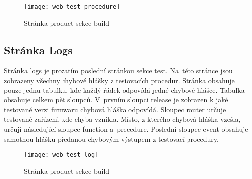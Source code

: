 \begin{figure}[h]
  \centering
  \texttt{[image: web\_test\_procedure]}
  \caption{Stránka product sekce build}
  \label{fig:web_test_device}
\end{figure}

\subsection{Stránka Logs}
Stránka logs je prozatím poslední stránkou sekce test. Na~této stránce jsou zobrazeny všechny chybové hlášky z testovacích procedur. Stránka obsahuje pouze jednu tabulku, kde každý řádek odpovídá jedné chybové hlášce. Tabulka obsahuje celkem pět sloupců. V~prvním sloupci release je zobrazen k jaké testované verzi firmwaru chybová hláška odpovídá. Sloupec router určuje testované zařízení, kde chyba vznikla. Místo, z kterého chybová hláška vzešla, určují následující sloupce function a~procedure. Poslední sloupec event obsahuje samotnou hlášku předanou chybovým výstupem z testovací procedury.

\begin{figure}[h]
  \centering
  \texttt{[image: web\_test\_log]}
  \caption{Stránka product sekce build}
  \label{fig:web_test_device}
\end{figure}

\endinput
